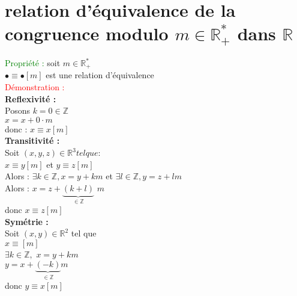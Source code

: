 \documentclass{article}
\begin{document}
	\section{relation d'équivalence de la congruence modulo $m \in \mathbb{R}^*_+$ dans $\mathbb{R}$}
	\textcolor{green}{Propriété :} soit $m \in \mathbb{R}^*_+$ \\
	\indent $\bullet \equiv \bullet [m]$ est une relation d'\'equivalence   \vspace{0.5cm} \\
	\textcolor{red}{Démonstration :}  \vspace{0.5cm} \\
	{\bf Reflexivit\'e :} \\
	 \indent Posons $ k = 0 \in \mathbb{Z}$ \\
	\indent $x=x + 0\cdot m$ \\
	 \indent donc : $x \equiv x[m]$ \\
	{ \bf Transitivit\'e :} \\
	 \indent Soit $(x,y,z) \in \mathbb{R}^3 tel que :$ \\
	\indent $x \equiv y[m]$ et $y \equiv z[m]$ \\
 \indent Alors : $\exists k \in \mathbb{Z}, x =y + km$ et $\exists l \in \mathbb{Z}, y = z + lm$ \\
 \indent Alors : $x = z + \underbrace{(k +l)}_{ \in \mathbb{Z} }$ $m$ \\
 \indent donc $ x \equiv z [m]$ \\
{ \bf Sym\'etrie :} \\
\indent Soit $(x,y) \in \mathbb{R}^2$ tel que \\
\indent $x \equiv [m]$ \\
\indent $\exists k \in \mathbb{Z},$ $x= y + k m$ \\
 \indent $y= x + \underbrace{(-k)}_{\in \mathbb{Z}}m$ \vspace{0.5cm} \\
\indent donc $y \equiv x [m]$
	
\end{document}
